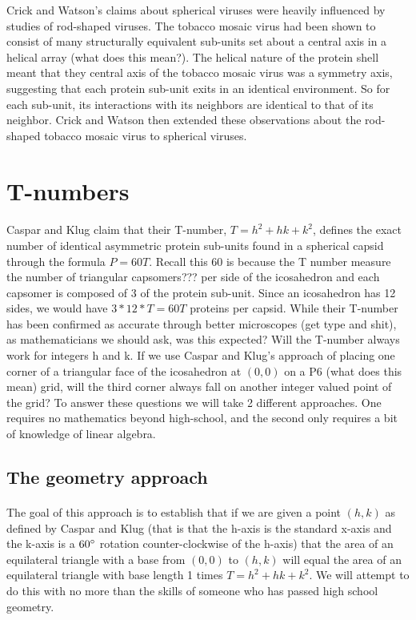 \documentclass[12pt,letter]{article}
\begin{document}
Crick and Watson's claims about spherical viruses were heavily influenced by studies of rod-shaped viruses. The tobacco mosaic virus had been shown to consist of many structurally equivalent sub-units set about a central axis in a helical array (what does this mean?). The helical nature of the protein shell meant that they central axis of the tobacco mosaic virus was a symmetry axis, suggesting that each protein sub-unit exits in an identical environment. So for each sub-unit, its interactions with its neighbors are identical to that of its neighbor. Crick and Watson then extended these observations about the rod-shaped tobacco mosaic virus to spherical viruses.


\section{T-numbers}
\paragraph{}
Caspar and Klug claim that their T-number, $T = h^2 + hk + k^2$, defines the exact number of identical asymmetric protein sub-units found in a spherical capsid through the formula $P = 60T$. Recall this 60 is because the T number measure the number of triangular capsomers??? per side of the icosahedron and each capsomer is composed of 3 of the protein sub-unit. Since an icosahedron has 12 sides, we would have $3*12*T = 60T$ proteins per capsid. While their T-number has been confirmed as accurate through better microscopes (get type and shit), as mathematicians we should ask, was this expected? Will the T-number always work for integers h and k. If we use Caspar and Klug's approach of placing one corner of a triangular face of the icosahedron at $(0,0)$ on a P6 (what does this mean) grid, will the third corner always fall on another integer valued point of the grid? To answer these questions we will take 2 different approaches. One requires no mathematics beyond high-school, and the second only requires a bit of knowledge of linear algebra.

\subsection{The geometry approach}

\paragraph{}
The goal of this approach is to establish that if we are given a point $(h,k)$ as defined by Caspar and Klug (that is that the h-axis is the standard x-axis and the k-axis is a $60\degree$ rotation counter-clockwise of the h-axis) that the area of an equilateral triangle with a base from $(0,0)$ to $(h,k)$ will equal the area of an equilateral triangle with base length 1 times $T = h^2 + hk + k^2$. We will attempt to do this with no more than the skills of someone who has passed high school geometry. \\
\end{document}
